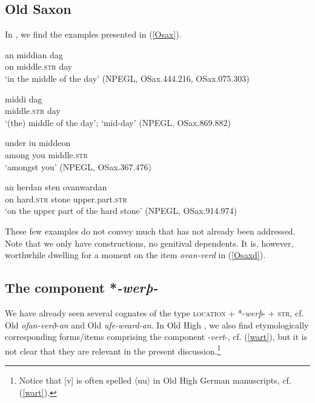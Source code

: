 \documentclass[output=paper,colorlinks,citecolor=brown]{langscibook}
\begin{document}
\subsection{Old Saxon }

    
In , we find the examples presented in (\ref{Osax}). 

\begin{exe}
   \ex \label{Osax}   
    \begin{xlist}
     \ex \gll an middian dag      \\ 
       on  middle.\textsc{str} day  \\ 
        \glt `in the middle of the day' (NPEGL, OSax.444.216,  OSax.075.303)

       \ex \gll middi dag     \\  
         middle.\textsc{str} day   \\
        \glt `(the) middle of the day'; `mid-day' (NPEGL, OSax.869.882)  

       \ex \gll under iu middeon         \\  
        among you  middle.\textsc{str}   \\  
        \glt `amongst you' (NPEGL, OSax.367.476)  

     \ex \label{Osaxd} \gll an herdan sten ovanwardan \\ 
       on hard.\textsc{str} stone upper.part.\textsc{str}   \\ 
        \glt `on the upper part of the hard stone' (NPEGL, OSax.914.974)   
   \end{xlist}
\end{exe} 

These few examples do not convey much that has not already been addressed. Note that we  only have  constructions, no genitival dependents. It is, however, worthwhile dwelling for a moment on the item \textit{ovan-verd} in  (\ref{Osaxd}).

\subsection{The component *\textit{-werþ-}}
\label{sec:10:vert}

We have already seen several cognates of the type  \textsc{location} + *-\textit{werþ}- + \textsc{str}, cf. Old  \textit{ofan-verð-an}  and Old  \textit{ufe-weard-an}. In  Old High , we also find etymologically corresponding forms/items comprising the component -\textit{vert}-, cf. (\ref{wart}), but it is not clear that they are relevant in the present discussion.\footnote{Notice that [v] is often spelled 〈uu〉 in Old High German manuscripts, cf. (\ref{wart}).}
\end{document}

